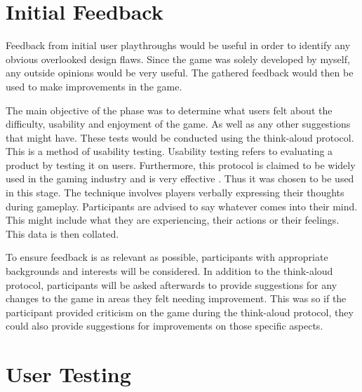 \documentclass[a4paper,11.5pt]{report}
\numberwithin{figure}{section}
\numberwithin{table}{section}
\numberwithin{equation}{section}
\numberwithin{equation}{section}
\begin{document}




\section{Initial Feedback}


Feedback from initial user playthroughs would be useful in order to identify any obvious overlooked design flaws. Since the game was solely developed by myself, any outside opinions would be very useful. The gathered feedback would then be used to make improvements in the game.

The main objective of the phase was to determine what users felt about the difficulty, usability and enjoyment of the game. As well as any other suggestions that might have. These tests would be conducted using the think-aloud protocol. This is a method of usability testing. Usability testing refers to evaluating a product by testing it on users. Furthermore, this protocol is claimed to be widely used in the gaming industry and is very effective \citep{desurvire2013}. Thus it was chosen to be used in this stage. The technique involves players verbally expressing their thoughts during gameplay. Participants are advised to say whatever comes into their mind. This might include what they are experiencing, their actions or their feelings. This data is then collated. 

To ensure feedback is as relevant as possible, participants with appropriate backgrounds and interests will be considered. In addition to the think-aloud protocol, participants will be asked afterwards to provide suggestions for any changes to the game in areas they felt needing improvement. This was so if the participant provided criticism on the game during the think-aloud protocol, they could also provide suggestions for improvements on those specific aspects.


\section{User Testing}
\end{document}

